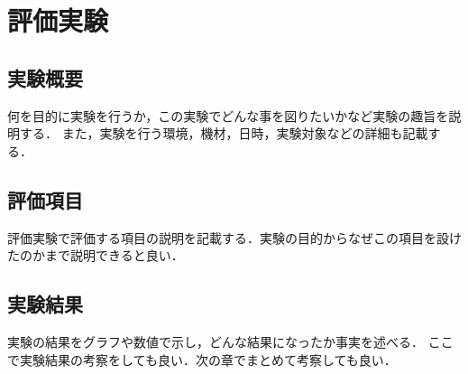 \chapter{評価実験}
\label{chap:evaluate}

\section{実験概要}
何を目的に実験を行うか，この実験でどんな事を図りたいかなど実験の趣旨を説明する．
また，実験を行う環境，機材，日時，実験対象などの詳細も記載する．

\section{評価項目}
評価実験で評価する項目の説明を記載する．実験の目的からなぜこの項目を設けたのかまで説明できると良い．



\section{実験結果}
実験の結果をグラフや数値で示し，どんな結果になったか事実を述べる．
ここで実験結果の考察をしても良い．次の章でまとめて考察しても良い．


